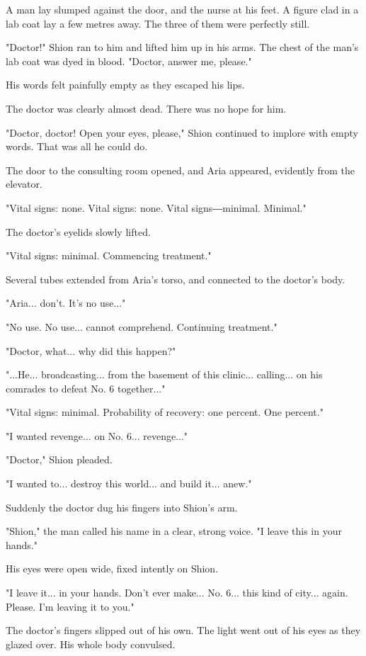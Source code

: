 A man lay slumped against the door, and the nurse at his feet. A figure
clad in a lab coat lay a few metres away. The three of them were
perfectly still.

"Doctor!" Shion ran to him and lifted him up in his arms. The chest of
the man's lab coat was dyed in blood. "Doctor, answer me, please."

His words felt painfully empty as they escaped his lips.

The doctor was clearly almost dead. There was no hope for him.

"Doctor, doctor! Open your eyes, please," Shion continued to implore
with empty words. That was all he could do.

The door to the consulting room opened, and Aria appeared, evidently
from the elevator.

{\sffamily "Vital signs: none. Vital signs: none. Vital signs―minimal. Minimal."}

The doctor's eyelids slowly lifted.

{\sffamily "Vital signs: minimal. Commencing treatment."}

Several tubes extended from Aria's torso, and connected to the doctor's
body.

"Aria... don't. It's no use..."

{\sffamily "No use. No use... cannot comprehend. Continuing treatment."}

"Doctor, what... why did this happen?"

"...He... broadcasting... from the basement of this clinic... calling...
on his comrades to defeat No. 6 together..."

{\sffamily "Vital signs: minimal. Probability of recovery: one percent. One
percent."}

"I wanted revenge... on No. 6... revenge..."

"Doctor," Shion pleaded.

"I wanted to... destroy this world... and build it... anew."

Suddenly the doctor dug his fingers into Shion's arm.

"Shion," the man called his name in a clear, strong voice. "I leave this
in your hands."

His eyes were open wide, fixed intently on Shion.

"I leave it... in your hands. Don't ever make... No. 6... this kind of
city... again. Please. I'm leaving it to you."

The doctor's fingers slipped out of his own. The light went out of his
eyes as they glazed over. His whole body convulsed.


